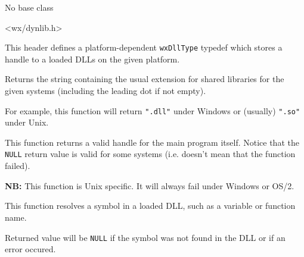 
No base class


<wx/dynlib.h>


This header defines a platform-dependent {\tt wxDllType} typedef which stores
a handle to a loaded DLLs on the given platform.


\label{wxdllloadergetdllext}


Returns the string containing the usual extension for shared libraries for the
given systems (including the leading dot if not empty).

For example, this function will return {\tt ".dll"} under Windows or (usually) 
{\tt ".so"} under Unix.

\label{wxdllloadergetprogramhandle}


This function returns a valid handle for the main program itself. Notice that
the {\tt NULL} return value is valid for some systems (i.e. doesn't mean that
the function failed).

{\bf NB:} This function is Unix specific. It will always fail under Windows
or OS/2.

\label{wxdllloadergetsymbol}


This function resolves a symbol in a loaded DLL, such as a variable or
function name.

Returned value will be {\tt NULL} if the symbol was not found in the DLL or if
an error occured.




\label{wxdllloaderloadlibrary}


